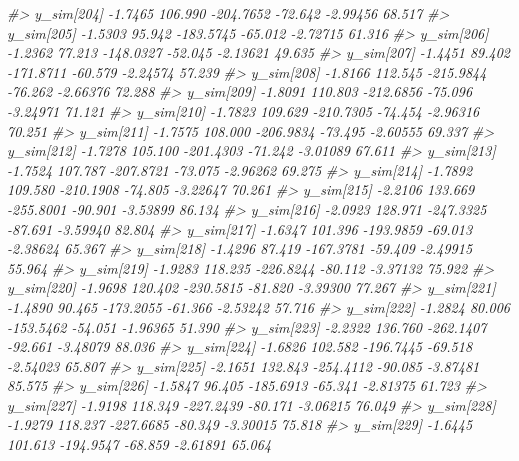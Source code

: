 \documentclass[
  10pt,
  italian,
  a4paper,
  extrafontsizes,onecolumn,openright
  ]{memoir}
\newenvironment{Shaded}{\begin{snugshade}}{\end{snugshade}}
\newcommand{\CommentTok}[1]{\textcolor[rgb]{0.56,0.35,0.01}{\textit{#1}}}
\begin{document}
\begin{Shaded}
\begin{Highlighting}[]
\CommentTok{\#\textgreater{}   y\_sim[204] {-}1.7465 106.990 {-}204.7652 {-}72.642 {-}2.99456 68.517}
\CommentTok{\#\textgreater{}   y\_sim[205] {-}1.5303  95.942 {-}183.5745 {-}65.012 {-}2.72715 61.316}
\CommentTok{\#\textgreater{}   y\_sim[206] {-}1.2362  77.213 {-}148.0327 {-}52.045 {-}2.13621 49.635}
\CommentTok{\#\textgreater{}   y\_sim[207] {-}1.4451  89.402 {-}171.8711 {-}60.579 {-}2.24574 57.239}
\CommentTok{\#\textgreater{}   y\_sim[208] {-}1.8166 112.545 {-}215.9844 {-}76.262 {-}2.66376 72.288}
\CommentTok{\#\textgreater{}   y\_sim[209] {-}1.8091 110.803 {-}212.6856 {-}75.096 {-}3.24971 71.121}
\CommentTok{\#\textgreater{}   y\_sim[210] {-}1.7823 109.629 {-}210.7305 {-}74.454 {-}2.96316 70.251}
\CommentTok{\#\textgreater{}   y\_sim[211] {-}1.7575 108.000 {-}206.9834 {-}73.495 {-}2.60555 69.337}
\CommentTok{\#\textgreater{}   y\_sim[212] {-}1.7278 105.100 {-}201.4303 {-}71.242 {-}3.01089 67.611}
\CommentTok{\#\textgreater{}   y\_sim[213] {-}1.7524 107.787 {-}207.8721 {-}73.075 {-}2.96262 69.275}
\CommentTok{\#\textgreater{}   y\_sim[214] {-}1.7892 109.580 {-}210.1908 {-}74.805 {-}3.22647 70.261}
\CommentTok{\#\textgreater{}   y\_sim[215] {-}2.2106 133.669 {-}255.8001 {-}90.901 {-}3.53899 86.134}
\CommentTok{\#\textgreater{}   y\_sim[216] {-}2.0923 128.971 {-}247.3325 {-}87.691 {-}3.59940 82.804}
\CommentTok{\#\textgreater{}   y\_sim[217] {-}1.6347 101.396 {-}193.9859 {-}69.013 {-}2.38624 65.367}
\CommentTok{\#\textgreater{}   y\_sim[218] {-}1.4296  87.419 {-}167.3781 {-}59.409 {-}2.49915 55.964}
\CommentTok{\#\textgreater{}   y\_sim[219] {-}1.9283 118.235 {-}226.8244 {-}80.112 {-}3.37132 75.922}
\CommentTok{\#\textgreater{}   y\_sim[220] {-}1.9698 120.402 {-}230.5815 {-}81.820 {-}3.39300 77.267}
\CommentTok{\#\textgreater{}   y\_sim[221] {-}1.4890  90.465 {-}173.2055 {-}61.366 {-}2.53242 57.716}
\CommentTok{\#\textgreater{}   y\_sim[222] {-}1.2824  80.006 {-}153.5462 {-}54.051 {-}1.96365 51.390}
\CommentTok{\#\textgreater{}   y\_sim[223] {-}2.2322 136.760 {-}262.1407 {-}92.661 {-}3.48079 88.036}
\CommentTok{\#\textgreater{}   y\_sim[224] {-}1.6826 102.582 {-}196.7445 {-}69.518 {-}2.54023 65.807}
\CommentTok{\#\textgreater{}   y\_sim[225] {-}2.1651 132.843 {-}254.4112 {-}90.085 {-}3.87481 85.575}
\CommentTok{\#\textgreater{}   y\_sim[226] {-}1.5847  96.405 {-}185.6913 {-}65.341 {-}2.81375 61.723}
\CommentTok{\#\textgreater{}   y\_sim[227] {-}1.9198 118.349 {-}227.2439 {-}80.171 {-}3.06215 76.049}
\CommentTok{\#\textgreater{}   y\_sim[228] {-}1.9279 118.237 {-}227.6685 {-}80.349 {-}3.30015 75.818}
\CommentTok{\#\textgreater{}   y\_sim[229] {-}1.6445 101.613 {-}194.9547 {-}68.859 {-}2.61891 65.064}

\end{Highlighting}
\end{Shaded}
\end{document}
